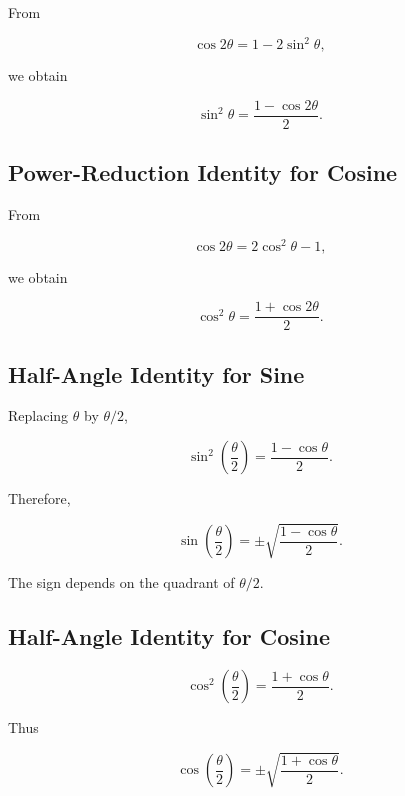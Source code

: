 From

\[
\cos2\theta
=
1-2\sin^2\theta,
\]

we obtain

\[
\boxed{
\sin^2\theta
=
\frac{
1-\cos2\theta
}{2}.
}
\]

\subsection{Power-Reduction Identity for Cosine}
\label{subsec:cosine-power-reduction}

From

\[
\cos2\theta
=
2\cos^2\theta-1,
\]

we obtain

\[
\boxed{
\cos^2\theta
=
\frac{
1+\cos2\theta
}{2}.
}
\]

\subsection{Half-Angle Identity for Sine}
\label{subsec:sine-half-angle}

Replacing \(\theta\) by \(\theta/2\),

\[
\boxed{
\sin^2
\left(
\frac{\theta}{2}
\right)
=
\frac{
1-\cos\theta
}{2}.
}
\]

Therefore,

\[
\boxed{
\sin
\left(
\frac{\theta}{2}
\right)
=
\pm
\sqrt{
\frac{
1-\cos\theta
}{2}
}.
}
\]

The sign depends on the quadrant of \(\theta/2\).

\subsection{Half-Angle Identity for Cosine}
\label{subsec:cosine-half-angle}

\[
\boxed{
\cos^2
\left(
\frac{\theta}{2}
\right)
=
\frac{
1+\cos\theta
}{2}.
}
\]

Thus

\[
\boxed{
\cos
\left(
\frac{\theta}{2}
\right)
=
\pm
\sqrt{
\frac{
1+\cos\theta
}{2}
}.
}
\]

